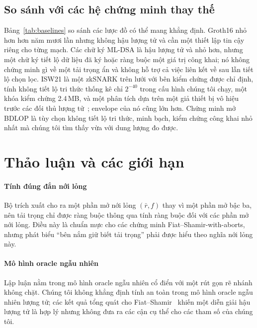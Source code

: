 \documentclass[journal]{IEEEtran}
\begin{document}


\subsection{So sánh với các hệ chứng minh thay thế}
Bảng~\ref{tab:baselines} so sánh các lược đồ có thể mang khẳng định. Groth16
nhỏ hơn hơn năm mươi lần nhưng không hậu lượng tử và cần một thiết lập tin cậy
riêng cho từng mạch. Các chữ ký ML-DSA là hậu lượng tử và nhỏ hơn, nhưng một
chữ ký tiết lộ dữ liệu đã ký hoặc ràng buộc một giá trị công khai; nó không
chứng minh gì về một tải trọng ẩn và không hỗ trợ cả việc liên kết về sau lẫn
tiết lộ chọn lọc. ISW21 là một zkSNARK trên lưới với bên kiểm chứng được chỉ
định, tính không tiết lộ tri thức thống kê chỉ $2^{-40}$ trong cấu hình chúng
tôi chạy, một khóa kiểm chứng 2.4\,MB, và một phân tích dựa trên một giả thiết
bị vô hiệu trước các đối thủ lượng tử~\cite{ref:dfs24}; envelope của nó cũng lớn
hơn. Chứng minh mở BDLOP là tùy chọn không tiết lộ tri thức, minh bạch, kiểm
chứng công khai nhỏ nhất mà chúng tôi tìm thấy vừa với dung lượng đo được.



\section{Thảo luận và các giới hạn}
\label{sec:discussion}

\paragraph{Tính đúng đắn nới lỏng} Bộ trích xuất cho ra một phần mở nới lỏng
$(\bar r,f)$ thay vì một phần mở bậc ba, nên tải trọng chỉ được ràng buộc thông
qua tính ràng buộc đối với các phần mở nới lỏng. Điều này là chuẩn mực cho các
chứng minh Fiat--Shamir-with-aborts, nhưng phát biểu ``bên nắm giữ biết tải
trọng'' phải được hiểu theo nghĩa nới lỏng này.

\paragraph{Mô hình oracle ngẫu nhiên} Lập luận nằm trong mô hình oracle ngẫu
nhiên cổ điển với một rút gọn rẽ nhánh không chặt. Chúng tôi không khẳng định
tính an toàn trong mô hình oracle ngẫu nhiên lượng tử; các kết quả tổng quát cho
Fiat--Shamir~\cite{ref:dfms19,ref:lz19} khiến một diễn giải hậu lượng tử là hợp
lý nhưng không đưa ra các cận cụ thể cho các tham số của chúng tôi.
\end{document}
